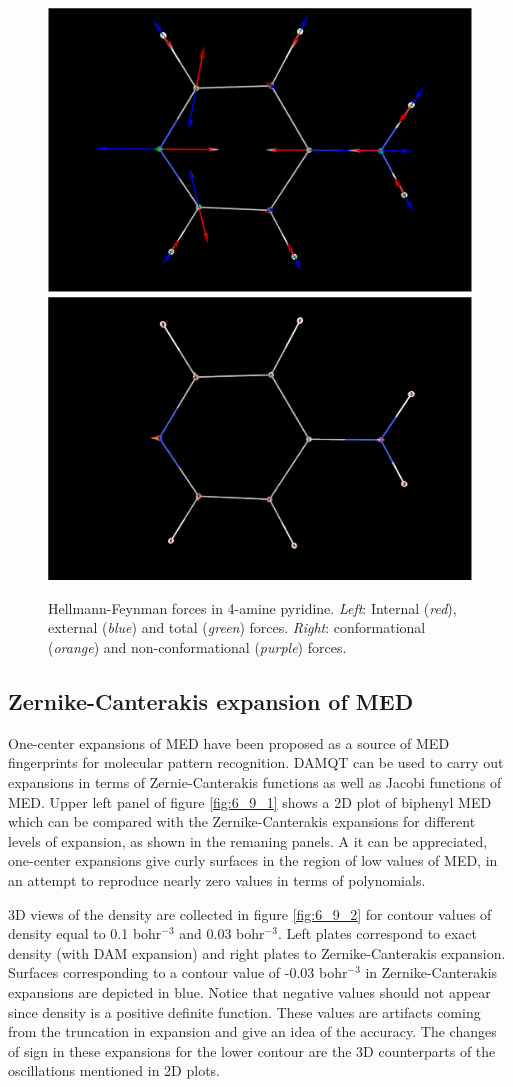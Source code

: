 \documentclass[10pt]{article}
\begin{document}
\begin{figure}[H]
\begin{center}
\includegraphics[width=.3\linewidth]{4ap-forces-1.png}
\hspace*{5mm}
\includegraphics[width=.3\linewidth]{4ap-forces-2.png}
\end{center}
\caption[Hellmann-Feynman forces in 4-amine pyridine]{ Hellmann-Feynman forces in 4-amine pyridine. 
{\it Left}: Internal ({\it red}), external ({\it blue}) and total ({\it green}) forces. 
{\it Right}: conformational ({\it orange}) and non-conformational ({\it purple}) forces.
\label{fig:6_8_1}}
\end{figure}

\subsection{Zernike-Canterakis expansion of MED \label{sec:6.9} }

One-center expansions of MED have been proposed as a source of MED fingerprints for
molecular pattern recognition. DAMQT can be used to carry out expansions in terms of Zernie-Canterakis
functions as well as Jacobi functions of MED. Upper left panel of figure \ref{fig:6_9_1} shows a 2D plot of biphenyl
MED which can be compared with the Zernike-Canterakis expansions for different levels of expansion, as shown
in the remaning panels.
A it can be appreciated, one-center expansions give curly surfaces in the region of low values of
MED, in an attempt to reproduce nearly zero values in terms of polynomials. 

3D views of the density are collected in figure  \ref{fig:6_9_2} for contour values of density
equal to 0.1 bohr$^{-3}$ and 0.03 bohr$^{-3}$. Left plates correspond to exact density (with DAM expansion)
and right plates to Zernike-Canterakis expansion. Surfaces corresponding to a contour value 
of -0.03 bohr$^{-3}$ in Zernike-Canterakis expansions
are depicted in blue. Notice that negative values should not appear since density is a positive definite function.
These values are artifacts coming from the truncation in expansion and give an idea of the accuracy.
The changes of sign in these expansions
for the lower contour are the 3D counterparts of the oscillations mentioned in 2D plots.
\end{document}
